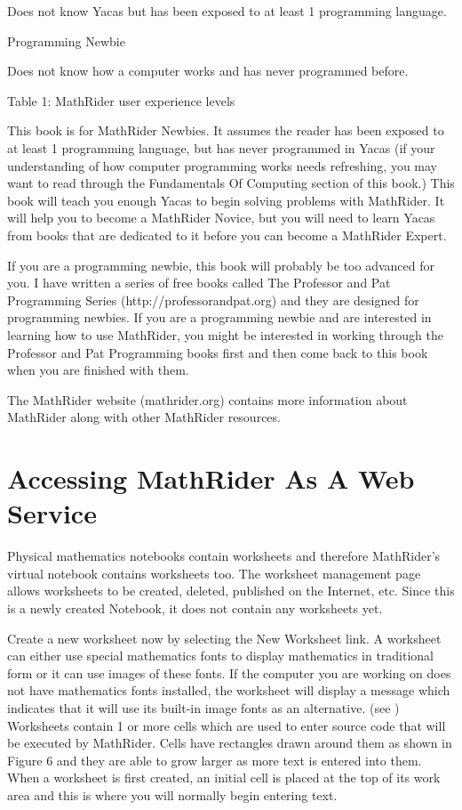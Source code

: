\documentclass[12pt,oneside]{book}
\begin{document}
Does not know Yacas but has been exposed to at least 1 programming
language.

Programming Newbie

Does not know how a computer works and has never programmed before.

Table 1: MathRider user experience levels


This book is for MathRider Newbies. It assumes the reader has been exposed to at least 1 programming language, but has never programmed in Yacas (if your understanding of how computer programming works needs refreshing, you may want to read through the Fundamentals Of Computing section of this book.) This book will teach you enough Yacas to begin solving problems with MathRider. It will help you to become a MathRider Novice, but you will need to learn Yacas from books that are dedicated to it before you can become a MathRider Expert.  

If you are a programming newbie, this book will probably be too advanced for you. I have written a series of free books called The Professor and Pat Programming Series (http://professorandpat.org) and they are designed for programming newbies. If you are a programming newbie and are interested in learning how to use MathRider, you might be interested in working through the Professor and Pat Programming books first and then come back to this book when you are finished with them. 


The MathRider website (mathrider.org) contains more information about MathRider along with other MathRider resources.

\section[Accessing MathRider As A Web Service]{Accessing MathRider As A Web Service}
Physical mathematics notebooks contain worksheets and therefore MathRider's virtual notebook contains worksheets too. The worksheet management page allows worksheets to be created, deleted, published on the Internet, etc. Since this is a newly created Notebook, it does not contain any worksheets yet.  

Create a new worksheet now by selecting the New Worksheet link. A worksheet can either use special mathematics fonts to display mathematics in traditional form or it can use images of these fonts. If the computer you are working on does not have mathematics fonts installed, the worksheet will display a message which indicates that it will use its built{}-in image fonts as an alternative. (see )  
Worksheets contain 1 or more cells which are used to enter source code that will be executed by MathRider. Cells have rectangles drawn around them as shown in Figure 6 and they are able to grow larger as more text is entered into them. When a worksheet is first created, an initial cell is placed at the top of its work area and this is where you will normally begin entering text.
\end{document}
